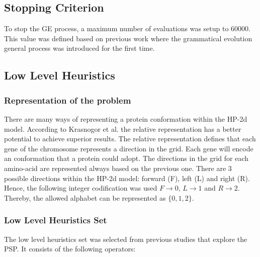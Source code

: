 \documentclass[conference]{IEEEtran}
\begin{document}
\subsection{Stopping Criterion}
\label{sub:criterioParada}

To stop the GE process, a maximum number of evaluations was setup to 60000. This value was defined based on previous work \cite{ryan1998grammatical} where the grammatical evolution general process was introduced for the first time. 

  \subsection{Low Level Heuristics} 
  
  \subsubsection{Representation of the problem} 
  There are many ways of representing a protein conformation within the HP-2d model. According to Krasnogor et al. \cite{krasnogor1999protein}  the relative representation has a better potential to achieve superior results. The relative representation defines that each gene of the chromosome represents a direction in the grid. Each gene will encode an conformation that a protein could adopt.
  The directions in the grid for each amino-acid are represented always based on the previous one. There are 3 possible directions within the HP-2d model: forward (F), left (L) and right (R). Hence, the following integer codification was used $F\rightarrow0$, $L\rightarrow1$ and $R\rightarrow2$. Thereby, the allowed alphabet can be represented as $\{0,1,2\}$.  

  \subsubsection{Low Level Heuristics Set}
 The low level heuristics set was selected from previous studies \cite{benitez2015algoritmo,custodio2014multiple, custodio2004investigation, garza2012multiobjectivizing} that explore the PSP. It consists of the following operators:
 
\end{document}
